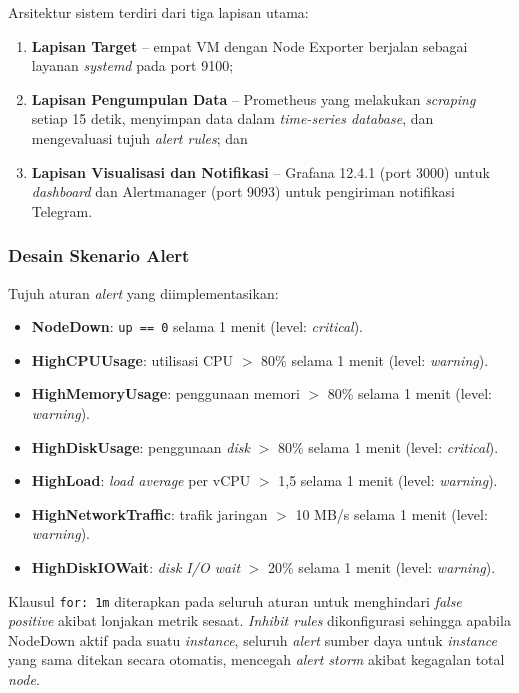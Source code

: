 \documentclass[10pt,twocolumn]{article}
\begin{document}
Arsitektur sistem terdiri dari tiga lapisan utama:
\begin{enumerate}[leftmargin=*, label=(\arabic*)]
  \item \textbf{Lapisan Target} -- empat VM dengan Node Exporter berjalan sebagai layanan
        \textit{systemd} pada port 9100;
  \item \textbf{Lapisan Pengumpulan Data} -- Prometheus yang melakukan \textit{scraping} setiap 15
        detik, menyimpan data dalam \textit{time-series database}, dan mengevaluasi tujuh
        \textit{alert rules}; dan
  \item \textbf{Lapisan Visualisasi dan Notifikasi} -- Grafana 12.4.1 (port 3000) untuk
        \textit{dashboard} dan Alertmanager (port 9093) untuk pengiriman notifikasi Telegram.
\end{enumerate}

\subsubsection{Desain Skenario Alert}

Tujuh aturan \textit{alert} yang diimplementasikan:
\begin{itemize}[leftmargin=*]
  \item \textbf{NodeDown}: \texttt{up == 0} selama 1 menit (level: \textit{critical}).
  \item \textbf{HighCPUUsage}: utilisasi CPU $>$ 80\% selama 1 menit (level: \textit{warning}).
  \item \textbf{HighMemoryUsage}: penggunaan memori $>$ 80\% selama 1 menit (level: \textit{warning}).
  \item \textbf{HighDiskUsage}: penggunaan \textit{disk} $>$ 80\% selama 1 menit (level:
        \textit{critical}).
  \item \textbf{HighLoad}: \textit{load average} per vCPU $>$ 1,5 selama 1 menit (level:
        \textit{warning}).
  \item \textbf{HighNetworkTraffic}: trafik jaringan $>$ 10 MB/s selama 1 menit (level:
        \textit{warning}).
  \item \textbf{HighDiskIOWait}: \textit{disk I/O wait} $>$ 20\% selama 1 menit (level:
        \textit{warning}).
\end{itemize}

Klausul \texttt{for: 1m} diterapkan pada seluruh aturan untuk menghindari \textit{false positive}
akibat lonjakan metrik sesaat. \textit{Inhibit rules} dikonfigurasi sehingga apabila NodeDown aktif
pada suatu \textit{instance}, seluruh \textit{alert} sumber daya untuk \textit{instance} yang sama
ditekan secara otomatis, mencegah \textit{alert storm} akibat kegagalan total \textit{node}.
\end{document}

